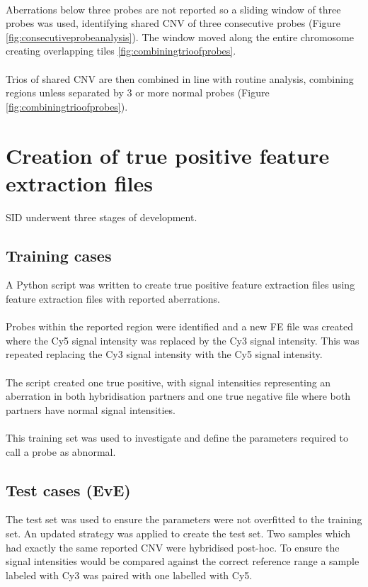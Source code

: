 \paragraph*{}
Aberrations below three probes are not reported so a sliding window of three probes was used, identifying shared CNV of three consecutive probes (Figure \ref{fig:consecutiveprobeanalysis}). The window moved along the entire chromosome creating overlapping tiles \ref{fig:combiningtrioofprobes}.

\paragraph*{}
Trios of shared CNV are then combined in line with routine analysis, combining regions unless separated by 3 or more normal probes (Figure \ref{fig:combiningtrioofprobes}).
\section{Creation of true positive feature extraction files}
SID underwent three stages of development.
\subsection{Training cases}
A Python script was written to create true positive feature extraction files using feature extraction files with reported aberrations. 
\paragraph*{}
Probes within the reported region were identified and a new FE file was created where the Cy5 signal intensity was replaced by the Cy3 signal intensity. This was repeated replacing the Cy3 signal intensity with the Cy5 signal intensity.
\paragraph*{}
The script created one true positive, with signal intensities representing an aberration in both hybridisation partners and one true negative file where both partners have normal signal intensities.
\paragraph*{}
This training set was used to investigate and define the parameters required to call a probe as abnormal. 
\subsection{Test cases (EvE)}
The test set was used to ensure the parameters were not overfitted to the training set. An updated strategy was applied to create the test set. Two samples which had exactly the same reported CNV were hybridised post-hoc. 
To ensure the signal intensities would be compared against the correct reference range a sample labeled with Cy3 was paired with one labelled with Cy5. 
